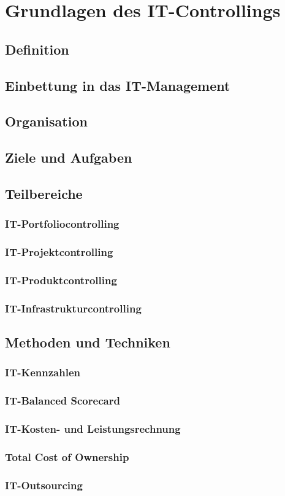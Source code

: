 \section{Grundlagen des IT-Controllings}
\subsection{Definition}
\subsection{Einbettung in das IT-Management}
\subsection{Organisation }
\subsection{Ziele und Aufgaben}
\subsection{Teilbereiche}
\subsubsection{IT-Portfoliocontrolling}
\subsubsection{IT-Projektcontrolling}
\subsubsection{IT-Produktcontrolling}
\subsubsection{IT-Infrastrukturcontrolling}
\subsection{Methoden und Techniken}
\subsubsection{IT-Kennzahlen}
\subsubsection{IT-Balanced Scorecard}
\subsubsection{IT-Kosten- und Leistungsrechnung}
\subsubsection{Total Cost of Ownership}
\subsubsection{IT-Outsourcing}
